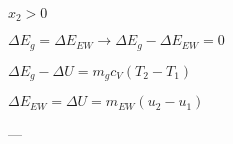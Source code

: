 \( x_2 > 0 \)  

\( \Delta E_g = \Delta E_{EW} \rightarrow \Delta E_g - \Delta E_{EW} = 0 \)  

\( \Delta E_g - \Delta U = m_g c_V (T_2 - T_1) \)  

\( \Delta E_{EW} = \Delta U = m_{EW} (u_2 - u_1) \)  

---